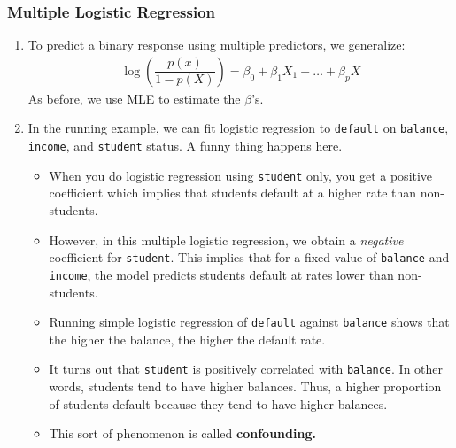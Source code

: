 \documentclass[10pt]{article}
\begin{document}
\subsubsection{Multiple Logistic Regression} 
\begin{enumerate}
	\item To predict a binary response using multiple predictors, we generalize:
	\begin{align*}
		\log\left( \dfrac{p(x)}{1 - p(X)} \right) = \beta_0 + \beta_1 X_1 + \dots + \beta_p X
	\end{align*}
	As before, we use MLE to estimate the $\beta$'s. 
	\item In the running example, we can fit logistic regression to {\tt default} on {\tt balance}, {\tt income}, and {\tt student} status.  A funny thing happens here.  \begin{itemize}
		\item When you do logistic regression using {\tt student} only, you get a positive coefficient which implies that students default at a higher rate than non-students. 
		\item However, in this multiple logistic regression, we obtain a \emph{negative} coefficient for {\tt student}.  This implies that for a fixed value of {\tt balance} and {\tt income}, the model predicts students default at rates lower than non-students.  
		\item Running simple logistic regression of {\tt default} against {\tt balance} shows that the higher the balance, the higher the default rate.
		\item It turns out that {\tt student}  is positively correlated with {\tt balance}.  In other words, students tend to have higher balances.  Thus, a higher proportion of students default because they tend to have higher balances.
		\item This sort of phenomenon is called \textbf{confounding.} 
	\end{itemize}
\end{enumerate}
\end{document}
